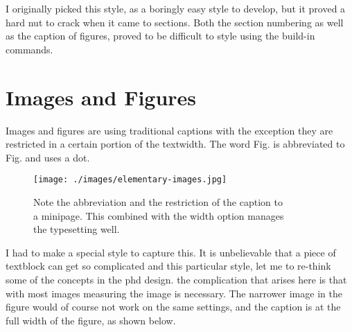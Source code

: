 I originally picked this style, as a boringly easy style to develop, but it proved a hard nut to crack when it came to sections. Both the section numbering as well as the caption of figures, proved to be difficult to style using
the build-in \latexe commands. 

\section{Images and Figures}

Images and figures are using traditional captions with the exception they are restricted in a certain portion of the textwidth. The word Fig. is abbreviated to Fig. and uses a dot.

\captionsetup[figure]{format = plain,
                                 width=.67\textwidth,
                                 justification=justified,
                                 singlelinecheck=false,
                                 name=Fig.,
                                 labelsep=space,
                                 oneside,
                                 margin=0pt
                                 }

\begin{figure}[ht]
\texttt{[image: ./images/elementary-images.jpg]}
\caption{Note the abbreviation and the restriction of the caption to\\
 a minipage. This combined with the width option manages\\
  the typesetting well.}
\end{figure}

I had to make a special style to capture this. It is unbelievable that a piece of textblock can get so complicated and this particular style, let me to re-think some of the concepts in the phd design. the complication that arises here
is that with most images measuring the image is necessary. The narrower image in the figure would of course not work on the same settings, and the caption is at the full width of the figure, as shown below.













\makeatother
